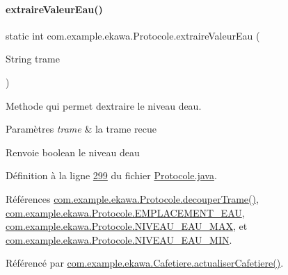 \paragraph{\texorpdfstring{extraire\+Valeur\+Eau()}{extraireValeurEau()}}
{\footnotesize\ttfamily static int com.\+example.\+ekawa.\+Protocole.\+extraire\+Valeur\+Eau (\begin{DoxyParamCaption}\item[{String}]{trame }\end{DoxyParamCaption})\hspace{0.3cm}{\ttfamily [static]}}



Methode qui permet d\textquotesingle{}extraire le niveau d\textquotesingle{}eau. 


\begin{DoxyParams}{Paramètres}
{\em trame} & la trame recue \\
\hline
\end{DoxyParams}
\begin{DoxyReturn}{Renvoie}
boolean le niveau d\textquotesingle{}eau 
\end{DoxyReturn}


Définition à la ligne \hyperlink{_protocole_8java_source_l00299}{299} du fichier \hyperlink{_protocole_8java_source}{Protocole.\+java}.



Références \hyperlink{_protocole_8java_source_l00208}{com.\+example.\+ekawa.\+Protocole.\+decouper\+Trame()}, \hyperlink{_protocole_8java_source_l00055}{com.\+example.\+ekawa.\+Protocole.\+E\+M\+P\+L\+A\+C\+E\+M\+E\+N\+T\+\_\+\+E\+AU}, \hyperlink{_protocole_8java_source_l00057}{com.\+example.\+ekawa.\+Protocole.\+N\+I\+V\+E\+A\+U\+\_\+\+E\+A\+U\+\_\+\+M\+AX}, et \hyperlink{_protocole_8java_source_l00056}{com.\+example.\+ekawa.\+Protocole.\+N\+I\+V\+E\+A\+U\+\_\+\+E\+A\+U\+\_\+\+M\+IN}.



Référencé par \hyperlink{_cafetiere_8java_source_l00543}{com.\+example.\+ekawa.\+Cafetiere.\+actualiser\+Cafetiere()}.


